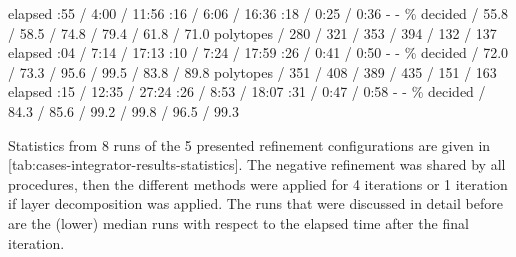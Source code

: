             \bTD  \eTD
            \bTD  \eTD
        \eTR
        \bTR
            \bTD elapsed \eTD
            :55 / 4:00 / 11:56 \eTD
            :16 / 6:06 / 16:36 \eTD
            :18 / 0:25 / 0:36 \eTD
            \bTD - \eTD
            \bTD - \eTD
        \eTR
        \bTR
            \bTD \% decided \eTD
             / 55.8 / 58.5 \eTD
             / 74.8 / 79.4 \eTD
             / 61.8 / 71.0 \eTD
            \bTD  \eTD
            \bTD  \eTD
        \eTR
        \bTR[topframe=on]
             \eTH
            \bTD polytopes \eTD
             / 280 / 321 \eTD
             / 353 / 394 \eTD
             / 132 / 137 \eTD
            \bTD  \eTD
            \bTD  \eTD
        \eTR
        \bTR
            \bTD elapsed \eTD
            :04 / 7:14 / 17:13 \eTD
            :10 / 7:24 / 17:59 \eTD
            :26 / 0:41 / 0:50 \eTD
            \bTD - \eTD
            \bTD - \eTD
        \eTR
        \bTR
            \bTD \% decided \eTD
             / 72.0 / 73.3 \eTD
             / 95.6 / 99.5 \eTD
             / 83.8 / 89.8 \eTD
            \bTD  \eTD
            \bTD  \eTD
        \eTR
        \bTR[topframe=on]
             \eTH
            \bTD polytopes \eTD
             / 351 / 408 \eTD
             / 389 / 435 \eTD
             / 151 / 163 \eTD
            \bTD  \eTD
            \bTD  \eTD
        \eTR
        \bTR
            \bTD elapsed \eTD
            :15 / 12:35 / 27:24 \eTD
            :26 / 8:53 / 18:07 \eTD
            :31 / 0:47 / 0:58 \eTD
            \bTD - \eTD
            \bTD - \eTD
        \eTR
        \bTR
            \bTD \% decided \eTD
             / 84.3 / 85.6 \eTD
             / 99.2 / 99.8 \eTD
             / 96.5 / 99.3 \eTD
            \bTD  \eTD
            \bTD  \eTD
        \eTR
    \eTABLE
\stopbuffer

\startsubsection[title={Comparison and Discussion},reference=sec:cases-integrator-results]

    Statistics from 8 runs of the 5 presented refinement configurations are given in [tab:cases-integrator-results-statistics].
    The negative refinement was shared by all procedures, then the different methods were applied for 4 iterations or 1 iteration if layer decomposition was applied.
    The runs that were discussed in detail before are the (lower) median runs with respect to the elapsed time after the final iteration.

